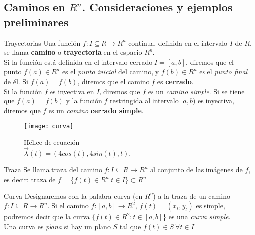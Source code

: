 \documentclass[a4paper, twoside]{article}
\numberwithin{equation}{section}
\numberwithin{figure}{section}
\numberwithin{table}{section}
\begin{document}
\subsection{Caminos en $R^{n}$. Consideraciones y ejemplos preliminares}
\begin{minipage}{0.5\textwidth}
	\begin{definicion*}{Trayectorias}
		Una función $f:I\subseteq R \to R^n$ continua, definida en el intervalo $I$ de $R$, se llama \textbf{camino} o \textbf{trayectoria} en el espacio $R^n$.\\
		
		Si la función está definida en el intervalo cerrado $I=[a,b]$, diremos que el punto $f(a) \in R^n$ es el \textit{punto inicial} del camino, y $f(b) \in R^n$ es el \textit{punto final} de él. Si $f(a)=f(b)$, diremos que el camino $f$ es \textbf{cerrado}.\\
		
		Si la función $f$ es inyectiva en $I$, diremos que $f$ es un \textit{camino simple}. Si se tiene que $f(a) = f(b)$ y la función $f$ restringida al intervalo $[a,b)$ es inyectiva, diremos que $f$ es un \textit{camino} \textbf{cerrado simple}.\\
	\end{definicion*}
\end{minipage}
\begin{minipage}{0.4\textwidth}
	\begin{figure}[H]
		\centering
		\texttt{[image: curva]}
		\caption{{\footnotesize Hélice de ecuación \\ $\vec{\lambda}(t)=(4cos(t),4sin(t),t)$.}}
	\end{figure}
\end{minipage}

\begin{definicion*}{Traza}
	Se llama traza del camino $f: I \subseteq R \to R^n$ al conjunto de las imágenes de $f$, es decir: traza de $f = \{f(t) \in R^n|t \in I\} \subset R^n$
\end{definicion*}

\begin{definicion*}{Curva}
	Designaremos con la palabra curva (en $R^n$) a la traza de un camino $f: I \subseteq R \to R^n$. Si el camino $f: [a,b] \to R^2,\, f(t) = (x_{t},y_{t})$ es simple, podremos decir que la curva $\{f(t) \in R^2:t \in [a,b]$\} es una \textit{curva simple}.\\
	
	Una curva es \textit{plana} si hay un plano $S$ tal que $f(t)\in S\:\forall t\in I$
\end{definicion*}
\end{document}
